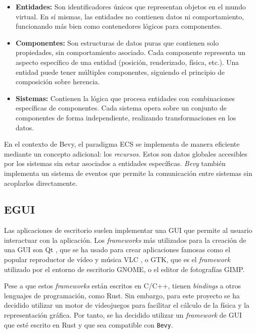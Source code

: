\begin{itemize}
    \item \textbf{Entidades:} Son identificadores únicos que representan objetos en el mundo virtual. En sí mismas, las entidades no contienen datos ni comportamiento, funcionando más bien como contenedores lógicos para componentes.
    
    \item \textbf{Componentes:} Son estructuras de datos puras que contienen solo propiedades, sin comportamiento asociado. Cada componente representa un aspecto específico de una entidad (posición, renderizado, física, etc.). Una entidad puede tener múltiples componentes, siguiendo el principio de composición sobre herencia.
    
    \item \textbf{Sistemas:} Contienen la lógica que procesa entidades con combinaciones específicas de componentes. Cada sistema opera sobre un conjunto de componentes de forma independiente, realizando transformaciones en los datos.
\end{itemize}

En el contexto de Bevy, el paradigma \ac{ECS} se implementa de manera eficiente mediante un concepto adicional: los \textit{recursos}. Estos son datos globales accesibles por los sistemas sin estar asociados a entidades específicas. \textit{Bevy} también implementa un sistema de eventos que permite la comunicación entre sistemas sin acoplarlos directamente.

\subsection{EGUI} \label{subsec:egui}

Las aplicaciones de escritorio suelen implementar una \ac{GUI} que permite al usuario interactuar con la aplicación. Los \textit{frameworks} más utilizados para la creación de una \ac{GUI} son Qt \autocite{Theqtstory}, que se ha usado para crear aplicaciones famosas como el popular reproductor de vídeo y música VLC \autocite{QtGTKVideoLAN}, o GTK, que es el \textit{framework} utilizado por el entorno de escritorio GNOME, o el editor de fotografías GIMP. 

Pese a que estos \textit{frameworks} están escritos en C/C++, tienen \textit{bindings} a otros lenguajes de programación, como Rust. Sin embargo, para este proyecto se ha decidido utilizar un motor de videojuegos para facilitar el cálculo de la física y la representación gráfica. Por tanto, se ha decidido utilizar un \textit{framework} de \ac{GUI} que esté escrito en Rust y que sea compatible con \texttt{Bevy}. 

